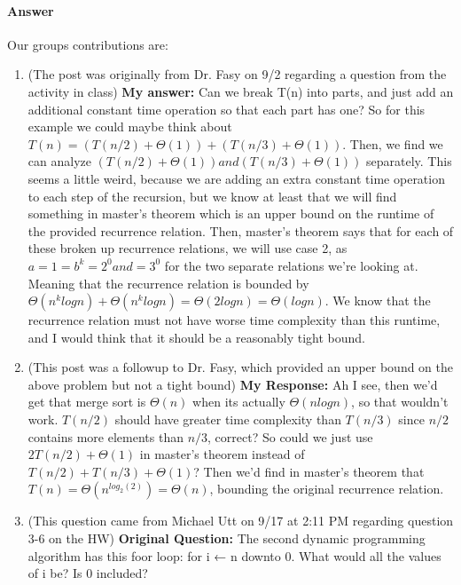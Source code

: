 \documentclass{article}
\begin{document}
\paragraph{Answer}


Our groups contributions are:
\begin{enumerate}
<<<<<<< HEAD
	\item (The post was originally from Dr. Fasy on 9/2 regarding a question from the activity in class)
	    \textbf{My answer:}
	    Can we break T(n) into parts, and just add an additional constant time operation 
		so that each part has one? So for this example we could maybe think about 
		$T(n) = (T(n/2) + \Theta(1)) + (T(n/3) + \Theta(1) )$. Then, we find we 
		can analyze $(T(n/2) + \Theta(1)) and (T(n/3) + \Theta(1))$ separately. 
		This seems a little weird, because we are adding an 
		extra constant time operation to each step of the recursion, 
		but we know at least that we will find something in master's theorem which 
		is an upper bound on the runtime of the provided recurrence relation.
		Then, master's theorem says that for 
		each of these broken up recurrence relations, we will use case 2, as $a = 1 = b^k = 2^0 and = 3^0$ 
		for the two separate relations we're looking at.
		Meaning that the recurrence relation is bounded by $\Theta(n^klogn) + \Theta(n^klogn) 
		= \Theta(2logn) = \Theta(logn)$. We know that the recurrence relation must not
		have worse time complexity than this runtime, and I would think that it should be a reasonably tight bound.

    \item (This post was a followup to Dr. Fasy, which provided an upper bound on the above problem but not a tight bound)
	    \textbf{My Response:}
		Ah I see, then we'd get that merge sort is $\Theta(n)$ when its actually $\Theta(nlogn)$, so that wouldn't work.
		$T(n/2)$ should have greater time complexity than $T(n/3)$ since $n/2$ contains more elements than $n/3$, 
		correct? So could we just use $2T(n/2) + \Theta(1)$ 
		in master's theorem instead of $T(n/2) + T(n/3) + \Theta(1)$?
		Then we'd find in master's theorem that $T(n) = \Theta(n^{log_2(2)}) = \Theta(n)$, 
		bounding the original recurrence relation.
    
    \item (This question came from Michael Utt on 9/17 at 2:11 PM regarding question 3-6 on the HW)
	    \textbf{Original Question:}
	    The second dynamic programming algorithm has this foor loop: for i ← n downto 0.
		What would all the values of i be? Is 0 included?


\end{enumerate}
\end{document}
